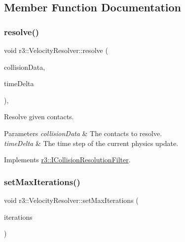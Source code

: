 \subsection{Member Function Documentation}
\mbox{\label{classr3_1_1_velocity_resolver_a93e8859d1ab3407b073328a58b7caeef}} 
\subsubsection{\texorpdfstring{resolve()}{resolve()}}
{\footnotesize\ttfamily void r3\+::\+Velocity\+Resolver\+::resolve (\begin{DoxyParamCaption}\item[{\mbox{\hyperlink{classr3_1_1_collision_data}{Collision\+Data}} \&}]{collision\+Data,  }\item[{\mbox{\hyperlink{namespacer3_ab2016b3e3f743fb735afce242f0dc1eb}{real}}}]{time\+Delta }\end{DoxyParamCaption})\hspace{0.3cm}{\ttfamily [override]}, {\ttfamily [virtual]}}



Resolve given contacts. 


\begin{DoxyParams}{Parameters}
{\em collision\+Data} & The contacts to resolve. \\
\hline
{\em time\+Delta} & The time step of the current physics update. \\
\hline
\end{DoxyParams}


Implements \mbox{\hyperlink{classr3_1_1_i_collision_resolution_filter_a87ef2579e2acaaadef4cd8f9a20005ce}{r3\+::\+I\+Collision\+Resolution\+Filter}}.

\mbox{\label{classr3_1_1_velocity_resolver_af0ec50fd4405261fc97b1985c127d3a6}} 
\subsubsection{\texorpdfstring{set\+Max\+Iterations()}{setMaxIterations()}}
{\footnotesize\ttfamily void r3\+::\+Velocity\+Resolver\+::set\+Max\+Iterations (\begin{DoxyParamCaption}\item[{unsigned int}]{iterations }\end{DoxyParamCaption})}

